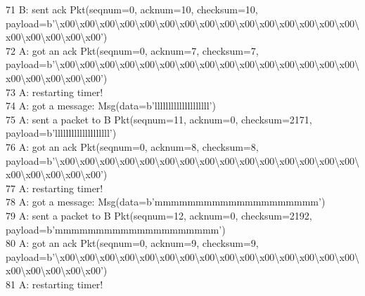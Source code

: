 \documentclass{article}
\begin{document}
{71 B: sent ack Pkt(seqnum=0, acknum=10, checksum=10,
payload=b'\textbackslash{}x00\textbackslash{}x00\textbackslash{}x00\textbackslash{}x00\textbackslash{}x00\textbackslash{}x00\textbackslash{}x00\textbackslash{}x00\textbackslash{}x00\textbackslash{}x00\textbackslash{}x00\textbackslash{}x00\textbackslash{}x00\textbackslash{}x00\textbackslash{}x00\textbackslash{}x00\textbackslash{}x00\textbackslash{}x00\textbackslash{}x00\textbackslash{}x00')
\\
72 A: got an ack Pkt(seqnum=0, acknum=7, checksum=7,
payload=b'\textbackslash{}x00\textbackslash{}x00\textbackslash{}x00\textbackslash{}x00\textbackslash{}x00\textbackslash{}x00\textbackslash{}x00\textbackslash{}x00\textbackslash{}x00\textbackslash{}x00\textbackslash{}x00\textbackslash{}x00\textbackslash{}x00\textbackslash{}x00\textbackslash{}x00\textbackslash{}x00\textbackslash{}x00\textbackslash{}x00\textbackslash{}x00\textbackslash{}x00')
\\
73 A: restarting timer! \\
74 A: got a message: Msg(data=b'llllllllllllllllllll') \\
75 A: sent a packet to B Pkt(seqnum=11, acknum=0, checksum=2171,
payload=b'llllllllllllllllllll') \\
76 A: got an ack Pkt(seqnum=0, acknum=8, checksum=8,
payload=b'\textbackslash{}x00\textbackslash{}x00\textbackslash{}x00\textbackslash{}x00\textbackslash{}x00\textbackslash{}x00\textbackslash{}x00\textbackslash{}x00\textbackslash{}x00\textbackslash{}x00\textbackslash{}x00\textbackslash{}x00\textbackslash{}x00\textbackslash{}x00\textbackslash{}x00\textbackslash{}x00\textbackslash{}x00\textbackslash{}x00\textbackslash{}x00\textbackslash{}x00')
\\
77 A: restarting timer! \\
78 A: got a message: Msg(data=b'mmmmmmmmmmmmmmmmmmmm') \\
79 A: sent a packet to B Pkt(seqnum=12, acknum=0, checksum=2192,
payload=b'mmmmmmmmmmmmmmmmmmmm') \\
80 A: got an ack Pkt(seqnum=0, acknum=9, checksum=9,
payload=b'\textbackslash{}x00\textbackslash{}x00\textbackslash{}x00\textbackslash{}x00\textbackslash{}x00\textbackslash{}x00\textbackslash{}x00\textbackslash{}x00\textbackslash{}x00\textbackslash{}x00\textbackslash{}x00\textbackslash{}x00\textbackslash{}x00\textbackslash{}x00\textbackslash{}x00\textbackslash{}x00\textbackslash{}x00\textbackslash{}x00\textbackslash{}x00\textbackslash{}x00')
\\
81 A: restarting timer! \\
}
\end{document}
